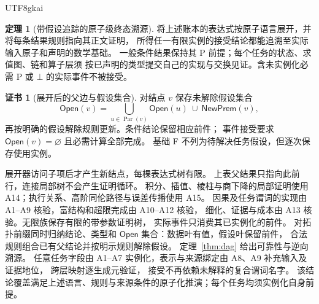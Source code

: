 \documentclass[12pt]{report}
\makeatletter
\theoremstyle{definition}
\newtheorem{theorem}{定理}[chapter]
\newtheorem{Certificate}{证书}[chapter]
\renewenvironment{proof}[1][\proofname]{\par
  \pushQED{\qed}\normalfont
  \topsep6\p@\@plus6\p@\relax
  \trivlist
  \item[\hskip\labelsep\normalfont #1\@addpunct{.}]\ignorespaces
}{
  \popQED\endtrivlist\@endpefalse
}
\makeatother
\begin{document}
\begin{CJK*}{UTF8}{gkai}
\begin{theorem}[带假设追踪的原子级终态溯源]
\label{thm:atomic-closure}
将上述账本的表达式按原子语言展开，并将每条结果规则指向其正文证明，
所得任一有限实例的接受结论都能追溯至实际输入原子和声明的数学基础。
一般条件结果保持其 P 前提；每个任务的状态、求值图、链和算子层须
按已声明的类型提交自己的实现与交换见证。含未实例化必需 P 或 \(\bot\) 的实际事件不被接受。
\end{theorem}
\begin{Certificate}[展开后的父边与假设集合]
对结点 \(v\) 保存未解除假设集合
\[
\mathsf{Open}(v)=
\bigcup_{u\in\operatorname{Par}(v)}\mathsf{Open}(u)
\ \cup\ \mathsf{NewPrem}(v),
\]
再按明确的假设解除规则更新。条件结论保留相应前件；
事件接受要求 \(\mathsf{Open}(v)=\varnothing\) 且必需计算全部完成。
基础 F 不列为待解决任务假设，但逐次保存使用实例。
\end{Certificate}
\begin{proof}
展开器访问子项后才产生新结点，每棵表达式树有限。
上表父结果只指向此前行，连接局部树不会产生证明循环。
积分、插值、棱柱与商下降的局部证明使用 A14；执行关系、高阶同伦路径与误差传播使用 A15。
因果及任务谓词的实现由 A1--A9 核验，富结构和超限完成由 A10--A12 核验，
细化、证据与成本由 A13 核验。无限族保存有限的带参数证明树，
实际事件只消费其已实例化的前件。
对拓扑前缀同时归纳结论、类型和
\(\mathsf{Open}\) 集合：数据叶有值，假设叶保留前件，
合法规则组合已有父结论并按明示规则解除假设。
定理~\ref{thm:dag} 给出可靠性与逆向溯源。
任意任务字段由 A1--A7 实例化，表示与来源绑定由 A8、A9 补充输入及证据地位，
跨层映射逐生成元验证，
接受不再依赖未解释的复合谓词名字。
该结论覆盖满足上述语言、规则与来源条件的原子化推演；每个任务均须实例化自身前提。
\end{proof}


\end{CJK*}
\end{document}
